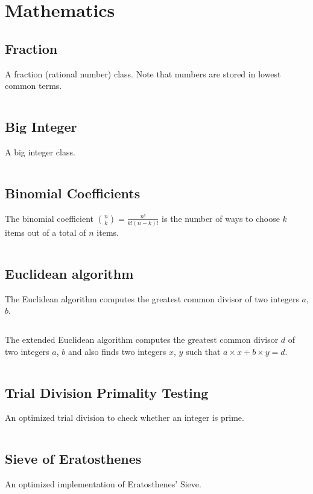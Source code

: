 \documentclass[9pt,a4paper,twocolumn,landscape,oneside]{amsart}
\newcommand{\code}[1]{\inputminted{cpp}{_code/#1}}
\begin{document}
\section{Mathematics}
    \subsection{Fraction}
        A fraction (rational number) class. Note that numbers are stored in
        lowest common terms.
        \code{mathematics/fraction.cpp}

    \subsection{Big Integer}
        A big integer class.
        \code{mathematics/intx.cpp}

    \subsection{Binomial Coefficients}
        The binomial coefficient $\binom{n}{k} = \frac{n!}{k!(n-k)!}$ is the
        number of ways to choose $k$ items out of a total of $n$ items.
        \code{mathematics/nck.cpp}

    \subsection{Euclidean algorithm}
        The Euclidean algorithm computes the greatest common divisor of two
        integers $a$, $b$.
        \code{mathematics/gcd.cpp}

        The extended Euclidean algorithm computes the greatest common divisor
        $d$ of two integers $a$, $b$ and also finds two integers $x$, $y$ such
        that $a\times x + b\times y = d$.
        \code{mathematics/egcd.cpp}

    \subsection{Trial Division Primality Testing}
        An optimized trial division to check whether an integer is prime.
        \code{mathematics/is_prime.cpp}

    \subsection{Sieve of Eratosthenes}
        An optimized implementation of Eratosthenes' Sieve.
        \code{mathematics/prime_sieve.cpp}
\end{document}
